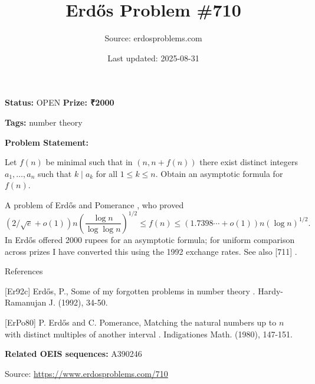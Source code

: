\documentclass{article}
\title{Erd\H{o}s Problem \#710}
\date{Last updated: 2025-08-31}
\author{Source: erdosproblems.com}
\begin{document}
\maketitle

\noindent\textbf{Status:} OPEN \quad \textbf{Prize: ₹2000}

\noindent\textbf{Tags:} number theory

\medskip

\noindent\textbf{Problem Statement:}

Let $f(n)$ be minimal such that in $(n,n+f(n))$ there exist distinct integers $a_1,\ldots,a_n$ such that $k\mid a_k$ for all $1\leq k\leq n$. Obtain an asymptotic formula for $f(n)$.




A problem of Erd\H{o}s and Pomerance \cite{ErPo80}, who proved\[(2/\sqrt{e}+o(1))n\left(\frac{\log n}{\log\log n}\right)^{1/2}\leq f(n)\leq (1.7398\cdots+o(1))n(\log n)^{1/2}.\]In \cite{Er92c} Erd\H{o}s offered 2000 rupees for an asymptotic formula; for uniform comparison across prizes I have converted this using the 1992 exchange rates. See also [711] .




References

[Er92c] Erd\H{o}s, P., Some of my forgotten problems in number theory . Hardy-Ramanujan J. (1992), 34-50.

[ErPo80] P. Erd\H{o}s and C. Pomerance, Matching the natural numbers up to $n$ with distinct multiples of another interval . Indigationes Math. (1980), 147-151.

\noindent\textbf{Related OEIS sequences:} A390246


\bigskip
\noindent\small{Source: \url{https://www.erdosproblems.com/710}}
\end{document}

